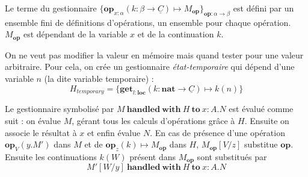 	Le terme du gestionnaire $\{\textbf{op}_{x:\alpha}(k:\beta \rightarrow \underline{C}) \mapsto M_\textbf{op} \}_{\textbf{op}:\alpha \rightarrow \beta}$ est défini par un ensemble fini de définitions d'opérations, un ensemble pour chaque opération. $M_\textbf{op}$ est dépendant de la variable $x$ et de la continuation $k$.
		
			
	
	\begin{exemple}\label{get2}
		On ne veut pas modifier la valeur en mémoire mais quand tester pour une valeur arbitraire. Pour cela, on crée un gestionnaire \textit{état-temporaire} qui dépend d'une variable $n$ (la dite variable temporaire) :
		\[H_{temporary} = \{\textbf{get}_{l:\textbf{loc}}(k:\textbf{nat} \rightarrow \underline{C}) \mapsto k(n)\}\]
	\end{exemple}
	\bigbreak

	Le gestionnaire symbolisé par $M~\textbf{handled}~\textbf{with}~H~\textbf{to}~x:A.N$ est évalué comme suit : on évalue $M$, gérant tous les calculs d'opérations grâce à $H$. Ensuite on associe le résultat à $x$ et enfin évalue $N$.
	En cas de présence d'une opération $\textbf{op}_V(y.M')$ dans $M$ et de $\textbf{op}_z(k) \mapsto M_\textbf{op}$ dans $H$, $M_\textbf{op}[V/z]$ substitue $\textbf{op}$. Ensuite les continuations $k(W)$ présent dans $M_\textbf{op}$ sont substitués par  
	\[M'[W/y]~\textbf{handled}~\textbf{with}~H~\textbf{to}~x:A.N\]

